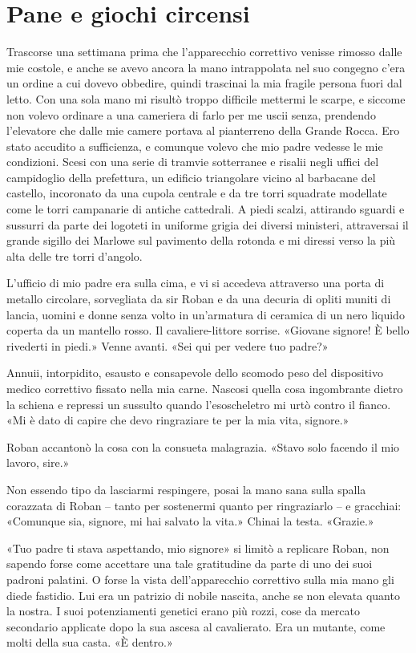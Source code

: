\chapter{Pane e giochi circensi}

Trascorse una settimana prima che l'apparecchio correttivo venisse
rimosso dalle mie costole, e anche se avevo ancora la mano intrappolata
nel suo congegno c'era un ordine a cui dovevo obbedire, quindi trascinai
la mia fragile persona fuori dal letto. Con una sola mano mi risultò
troppo difficile mettermi le scarpe, e siccome non volevo ordinare a una
cameriera di farlo per me uscii senza, prendendo l'elevatore che dalle
mie camere portava al pianterreno della Grande Rocca. Ero stato accudito
a sufficienza, e comunque volevo che mio padre vedesse le mie
condizioni. Scesi con una serie di tramvie sotterranee e risalii negli
uffici del campidoglio della prefettura, un edificio triangolare vicino
al barbacane del castello, incoronato da una cupola centrale e da tre
torri squadrate modellate come le torri campanarie di antiche
cattedrali. A piedi scalzi, attirando sguardi e sussurri da parte dei
logoteti in uniforme grigia dei diversi ministeri, attraversai il grande
sigillo dei Marlowe sul pavimento della rotonda e mi diressi verso la
più alta delle tre torri d'angolo.

L'ufficio di mio padre era sulla cima, e vi si accedeva attraverso una
porta di metallo circolare, sorvegliata da sir Roban e da una decuria di
opliti muniti di lancia, uomini e donne senza volto in un'armatura di
ceramica di un nero liquido coperta da un mantello rosso. Il
cavaliere-littore sorrise. «Giovane signore! È bello rivederti in
piedi.» Venne avanti. «Sei qui per vedere tuo padre?»

Annuii, intorpidito, esausto e consapevole dello scomodo peso del
dispositivo medico correttivo fissato nella mia carne. Nascosi quella
cosa ingombrante dietro la schiena e repressi un sussulto quando
l'esoscheletro mi urtò contro il fianco. «Mi è dato di capire che devo
ringraziare te per la mia vita, signore.»

Roban accantonò la cosa con la consueta malagrazia. «Stavo solo facendo
il mio lavoro, sire.»

Non essendo tipo da lasciarmi respingere, posai la mano sana sulla
spalla corazzata di Roban -- tanto per sostenermi quanto per
ringraziarlo -- e gracchiai: «Comunque sia, signore, mi hai salvato la
vita.» Chinai la testa. «Grazie.»

«Tuo padre ti stava aspettando, mio signore» si limitò a replicare
Roban, non sapendo forse come accettare una tale gratitudine da parte di
uno dei suoi padroni palatini. O forse la vista dell'apparecchio
correttivo sulla mia mano gli diede fastidio. Lui era un patrizio di
nobile nascita, anche se non elevata quanto la nostra. I suoi
potenziamenti genetici erano più rozzi, cose da mercato secondario
applicate dopo la sua ascesa al cavalierato. Era un mutante, come molti
della sua casta. «È dentro.»


